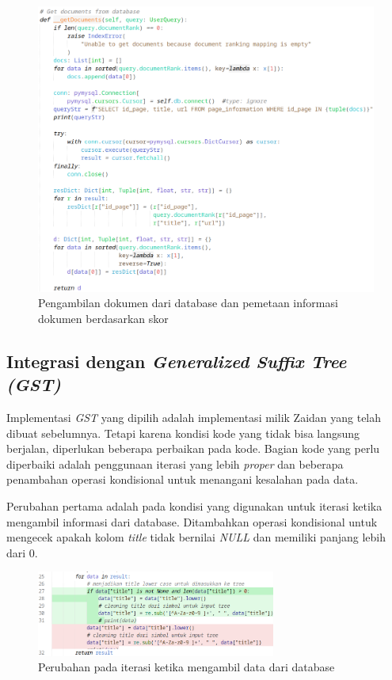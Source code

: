 \begin{figure}[H]
  \centering{}
	\includegraphics[width=\textwidth]{gambar/implementasi_getdocuments}
  \caption{Pengambilan dokumen dari database dan pemetaan informasi dokumen 
  berdasarkan skor}
\end{figure}

\subsection{Integrasi dengan \textit{Generalized Suffix Tree (GST)}}

Implementasi \textit{GST} yang dipilih adalah implementasi milik Zaidan yang 
telah dibuat sebelumnya. Tetapi karena kondisi kode yang tidak bisa langsung 
berjalan, diperlukan beberapa perbaikan pada kode. Bagian kode yang perlu 
diperbaiki adalah penggunaan iterasi yang lebih \textit{proper} dan beberapa 
penambahan operasi kondisional untuk menangani kesalahan pada data.

Perubahan pertama adalah pada kondisi yang digunakan untuk iterasi ketika 
mengambil informasi dari database. Ditambahkan operasi kondisional untuk 
mengecek apakah kolom \textit{title} tidak bernilai \textit{NULL} dan memiliki 
panjang lebih dari $0$.

\begin{figure}[H]
  \centering{}
	\includegraphics[width=0.7\textwidth]{gambar/implementasi_gstchange2}
  \caption{Perubahan pada iterasi ketika mengambil data dari database}
\end{figure}

